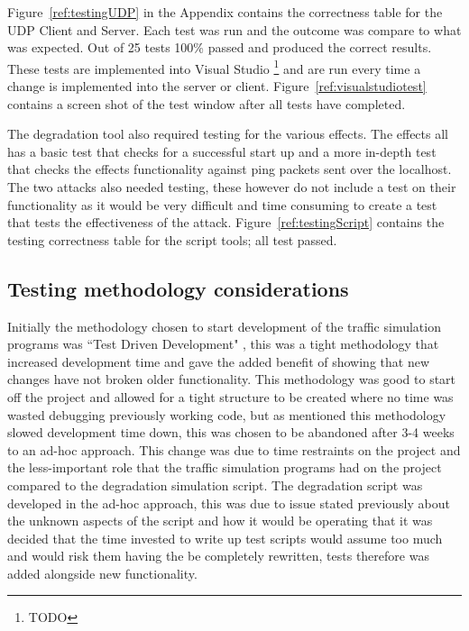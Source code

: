 Figure~\ref{ref:testingUDP} in the Appendix contains the correctness table for the UDP Client and Server. Each test was run and the outcome was compare to what was expected. Out of 25 tests 100\% passed and produced the correct results. These tests are implemented into Visual Studio \footnote{TODO} and are run every time a change is implemented into the server or client. Figure~\ref{ref:visualstudiotest} contains a screen shot of the test window after all tests have completed.

The degradation tool also required testing for the various effects. The effects all has a basic test that checks for a successful start up and a more in-depth test that checks the effects functionality against ping packets sent over the localhost. The two attacks also needed testing, these however do not include a test on their functionality as it would be very difficult and time consuming to create a test that tests the effectiveness of the attack. Figure~\ref{ref:testingScript} contains the testing correctness table for the script tools; all test passed.

\subsection{Testing methodology considerations}
Initially the methodology chosen to start development of the traffic simulation programs was ``Test Driven Development" \citep{beck2003test}, this was a tight methodology that increased development time and gave the added benefit of showing that new changes have not broken older functionality. This methodology was good to start off the project and allowed for a tight structure to be created where no time was wasted debugging previously working code, but as mentioned this methodology slowed development time down, this was chosen to be abandoned after 3-4 weeks to an ad-hoc approach. 
This change was due to time restraints on the project and the less-important role that the traffic simulation programs had on the project compared to the degradation simulation script. The degradation script was developed in the ad-hoc approach, this was due to issue stated previously about the unknown aspects of the script and how it would be operating that it was decided that the time invested to write up test scripts would assume too much and would risk them having the be completely rewritten, tests therefore was added alongside new functionality.





